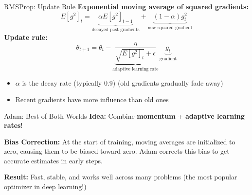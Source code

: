 \begin{frame}{RMSProp: Update Rule}
\textbf{Exponential moving average of squared gradients:}
\[
E[g^2]_t = \underbrace{\alpha E[g^2]_{t-1}}_{\text{decayed past gradients}} + \underbrace{(1 - \alpha) g_t^2}_{\text{new squared gradient}}
\]
\textbf{Update rule:}
\[
\theta_{t+1} = \theta_t - \underbrace{\frac{\eta}{\sqrt{E[g^2]_t} + \epsilon}}_{\text{adaptive learning rate}} \, \underbrace{g_t}_{\text{gradient}}
\]
\begin{itemize}
\item $\alpha$ is the decay rate (typically 0.9) (old gradients gradually fade away)
\item Recent gradients have more influence than old ones
\end{itemize}
\end{frame}

\begin{frame}{Adam: Best of Both Worlds}
\textbf{Idea:} Combine \textbf{momentum} + \textbf{adaptive learning rates}!
\centering
{}

\textbf{Bias Correction:} At the start of training, moving averages are initialized to zero, causing them to be biased toward zero. Adam corrects this bias to get accurate estimates in early steps.

\vspace{0.5em}
\textbf{Result:} Fast, stable, and works well across many problems (the most popular optimizer in deep learning!)
\end{frame}

